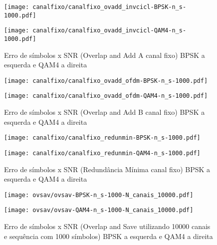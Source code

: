 \documentclass[a4paper,twoside]{articlewithlogo}
\begin{document}
\begin{figure}[H]
    \centering
    \begin{minipage}{.5\textwidth}
        \centering
        \texttt{[image: canalfixo/canalfixo\_ovadd\_invcicl-BPSK-n\_s-1000.pdf]}
    \end{minipage}%
    \begin{minipage}{0.5\textwidth}
        \centering
        \texttt{[image: canalfixo/canalfixo\_ovadd\_invcicl-QAM4-n\_s-1000.pdf]}
    \end{minipage}
    \caption{Erro de símbolos x SNR (Overlap and Add A canal fixo) BPSK a esquerda e QAM4 a direita}
    \label{fig:canalfixo_ovadd_invcicl}
\end{figure}

\begin{figure}[H]
    \centering
    \begin{minipage}{.5\textwidth}
        \centering
        \texttt{[image: canalfixo/canalfixo\_ovadd\_ofdm-BPSK-n\_s-1000.pdf]}
        
    \end{minipage}%
    \begin{minipage}{0.5\textwidth}
        \centering
        \texttt{[image: canalfixo/canalfixo\_ovadd\_ofdm-QAM4-n\_s-1000.pdf]}
        
    \end{minipage}
    \caption{Erro de símbolos x SNR (Overlap and Add B canal fixo) BPSK a esquerda e QAM4 a direita}
    \label{fig:canalfixo_ovadd_ofdm}
\end{figure}

\begin{figure}[H]
    \centering
    \begin{minipage}{.5\textwidth}
        \centering
        \texttt{[image: canalfixo/canalfixo\_redunmin-BPSK-n\_s-1000.pdf]}
    \end{minipage}%
    \begin{minipage}{0.5\textwidth}
        \centering
        \texttt{[image: canalfixo/canalfixo\_redunmin-QAM4-n\_s-1000.pdf]}
    \end{minipage}
    \caption{Erro de símbolos x SNR (Redundância Mínima canal fixo) BPSK a esquerda e QAM4 a direita}
    \label{fig:canalfixo_redunmin}
\end{figure}


\begin{figure}[H]
    \centering
    \begin{minipage}{.5\textwidth}
        \centering
        \texttt{[image: ovsav/ovsav-BPSK-n\_s-1000-N\_canais\_10000.pdf]}
    \end{minipage}%
    \begin{minipage}{0.5\textwidth}
        \centering
        \texttt{[image: ovsav/ovsav-QAM4-n\_s-1000-N\_canais\_10000.pdf]}
    \end{minipage}
    \caption{Erro de símbolos x SNR (Overlap and Save utilizando 10000 canais e sequência com 1000 símbolos) BPSK a esquerda e QAM4 a direita}
        \label{fig:ovsav-n_s-1000-N_canais_10000}
\end{figure}
\end{document}
